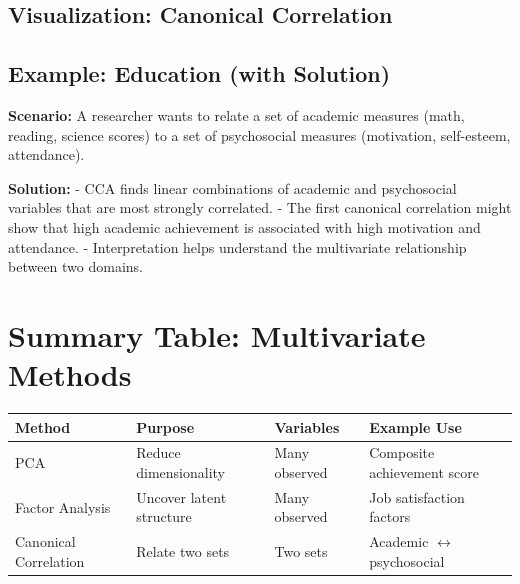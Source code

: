 \documentclass[11pt]{article}
\begin{document}
\subsection*{Visualization: Canonical Correlation}
\begin{center}
\end{center}

\subsection{Example: Education (with Solution)}

\textbf{Scenario:} A researcher wants to relate a set of academic measures (math, reading, science scores) to a set of psychosocial measures (motivation, self-esteem, attendance).

\textbf{Solution:}
- CCA finds linear combinations of academic and psychosocial variables that are most strongly correlated.
- The first canonical correlation might show that high academic achievement is associated with high motivation and attendance.
- Interpretation helps understand the multivariate relationship between two domains.

\section{Summary Table: Multivariate Methods}

\begin{tabular}{|l|l|l|l|}
\hline
\textbf{Method} & \textbf{Purpose} & \textbf{Variables} & \textbf{Example Use} \\
\hline
PCA & Reduce dimensionality & Many observed & Composite achievement score \\
Factor Analysis & Uncover latent structure & Many observed & Job satisfaction factors \\
Canonical Correlation & Relate two sets & Two sets & Academic $\leftrightarrow$ psychosocial \\
\hline
\end{tabular}
\end{document}
